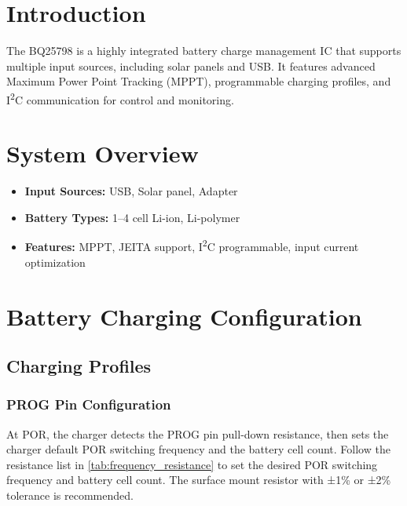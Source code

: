 \documentclass[12pt]{article}
\begin{document}

\section{Introduction}
The BQ25798 is a highly integrated battery charge management IC that supports multiple input sources, including solar panels and USB. It features advanced Maximum Power Point Tracking (MPPT), programmable charging profiles, and I\textsuperscript{2}C communication for control and monitoring.


\section{System Overview}
\begin{itemize}
  \item \textbf{Input Sources:} USB, Solar panel, Adapter
  \item \textbf{Battery Types:} 1–4 cell Li-ion, Li-polymer
  \item \textbf{Features:} MPPT, JEITA support, I\textsuperscript{2}C programmable, input current optimization
\end{itemize}


\section{Battery Charging Configuration}

\subsection{Charging Profiles}

\subsubsection{PROG Pin Configuration}
At POR, the charger detects the PROG pin pull-down resistance, then sets the charger default POR switching
frequency and the battery cell count. Follow the resistance list in \autoref{tab:frequency_resistance} to set the desired
POR switching frequency and battery cell count. The surface mount resistor with ±1\% or ±2\% tolerance is
recommended.
\end{document}

